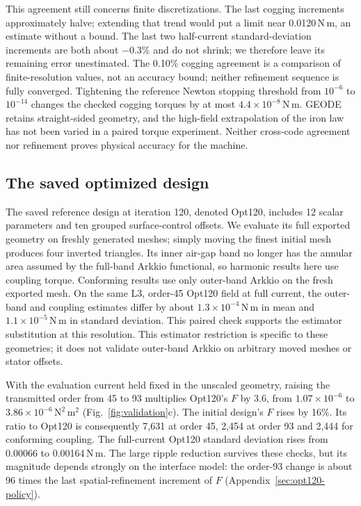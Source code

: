 \documentclass{anvil-paper}
\begin{document}
This agreement still concerns finite discretizations. The last cogging
increments approximately halve; extending that trend would put a limit
near 0.0120\,N\,m, an estimate without a bound. The last two half-current
standard-deviation increments are both about $-0.3\%$ and do not shrink;
we therefore leave its remaining error unestimated. The 0.10\% cogging
agreement is a comparison of finite-resolution values, not an accuracy
bound; neither refinement sequence is fully converged.
Tightening the reference Newton stopping threshold from $10^{-6}$ to
$10^{-14}$ changes the checked cogging torques by at most
$4.4\times10^{-8}$\,N\,m. GEODE retains straight-sided geometry, and the
high-field extrapolation of the iron law has not been varied in a paired
torque experiment. Neither cross-code agreement nor refinement proves
physical accuracy for the machine.

\subsection{The saved optimized design}\label{sec:opt120}
The saved reference design at iteration 120, denoted Opt120, includes
12 scalar parameters and ten grouped surface-control offsets. We evaluate
its full exported geometry on freshly generated meshes; simply moving
the finest initial mesh produces four inverted triangles. Its inner
air-gap band no longer has the annular area assumed by the full-band
Arkkio functional, so harmonic results here use coupling torque.
Conforming results use only outer-band Arkkio on the fresh exported mesh.
On the same L3, order-45 Opt120 field at full current, the outer-band and
coupling estimates differ by about $1.3\times10^{-4}$\,N\,m in mean and
$1.1\times10^{-5}$\,N\,m in standard deviation. This paired check supports
the estimator substitution at this resolution.
This estimator restriction is specific to these geometries; it does not
validate outer-band Arkkio on arbitrary moved meshes or stator offsets.

With the evaluation current held fixed in the unscaled geometry, raising
the transmitted order from 45 to 93 multiplies Opt120's $F$ by 3.6, from
$1.07\times10^{-6}$ to $3.86\times10^{-6}\,\mathrm{N^2\,m^2}$
(Fig.~\ref{fig:validation}c). The initial design's
$F$ rises by 16\%. Its ratio to Opt120 is consequently 7,631 at order 45,
2,454 at order 93 and 2,444 for conforming coupling. The full-current
Opt120 standard deviation rises from 0.00066 to 0.00164\,N\,m.
The large ripple reduction survives these checks, but its magnitude
depends strongly on the interface model: the order-93 change is about 96
times the last spatial-refinement increment of $F$
(Appendix~\ref{sec:opt120-policy}).
\end{document}
